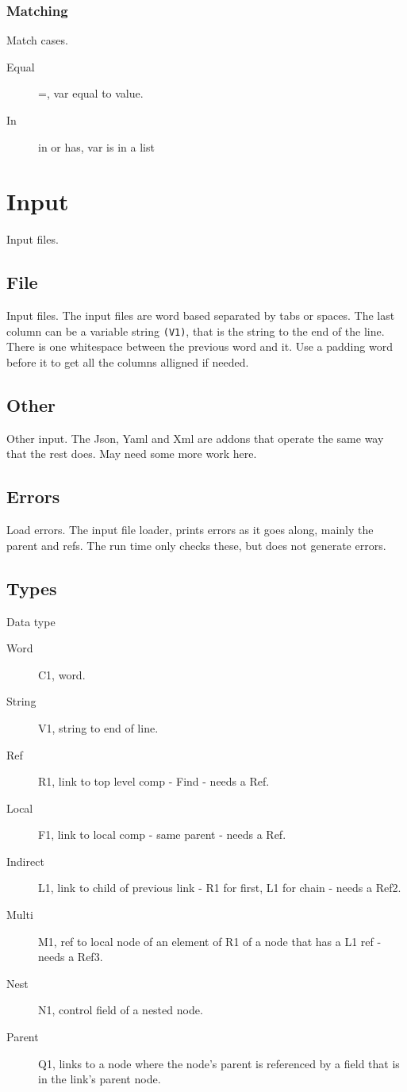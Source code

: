 \documentclass[11pt]{article}
\begin{document}
\subsubsection{Matching}
Match cases.
\begin{description}
\item[Equal]  =, var equal to value.
\item[In]  in or has, var is in a list 
\end{description}
\section{Input}
Input files.
\subsection{File}
Input files.
The input files are word based separated by tabs or spaces. The last
column can be a variable string \texttt{(V1)}, that is the string to the
end of the line. There is one whitespace between the previous word and
it. Use a padding word before it to get all the columns alligned if
needed.
\subsection{Other}
Other input.
The Json, Yaml and Xml are addons that operate the same way that the
rest does. May need some more work here.
\subsection{Errors}
Load errors.
The input file loader, prints errors as it goes along, mainly the parent
and refs. The run time only checks these, but does not generate errors.
\subsection{Types}
Data type
\begin{description}
\item[Word] C1, word.
\item[String] V1, string to end of line.
\item[Ref] R1, link to top level comp - Find - needs a Ref.
\item[Local] F1, link to local comp - same parent - needs a Ref.
\item[Indirect] L1, link to child of previous link - R1 for first, L1 for chain - needs a Ref2.
\item[Multi] M1, ref to local node of an element of R1 of a node that has a L1 ref - needs a Ref3.
\item[Nest] N1, control field of a nested node.
\item[Parent] Q1, links to a node where the node's parent is referenced by a field that is in the link's parent node.
\end{description}
\end{document}
